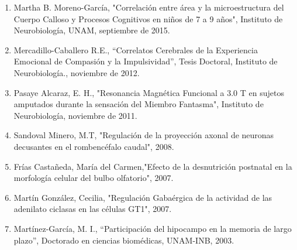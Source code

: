 \documentclass[11pt]{article}
\begin{document}
\begin{enumerate}
\item Martha B. Moreno-García, "Correlación entre área y la microestructura del Cuerpo Calloso y Procesos Cognitivos en niños de 7 a 9 años", Instituto de 
Neurobiología, UNAM,  septiembre de 2015.

\item Mercadillo-Caballero R.E., “Correlatos Cerebrales de la Experiencia Emocional de Compasión y la Impulsividad”, Tesis Doctoral, Instituto de 
Neurobiología.,  
noviembre de 2012.

\item Pasaye Alcaraz, E. H., "Resonancia Magnética Funcional a 3.0 T en sujetos amputados durante la sensación del Miembro Fantasma", Instituto de 
Neurobiología,  
noviembre de 2011.

\item Sandoval Minero, M.T, "Regulación de la proyección axonal de neuronas decusantes en el rombencéfalo caudal",  2008.

\item Frías Castañeda, María del Carmen,"Efecto de la desnutrición postnatal en la morfología celular del bulbo olfatorio",  2007.

\item Martín González, Cecilia, "Regulación Gabaérgica de la actividad de las adenilato ciclasas en las células GT1",  2007.

\item Martínez-García, M. I., “Participación del hipocampo en la memoria de largo plazo”, Doctorado en ciencias biomédicas, UNAM-INB,  2003.
\end{enumerate}
\end{document}
